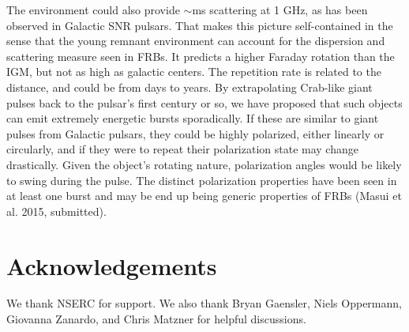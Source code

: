 \documentclass[useAMS,usenatbib]{mn2e}
\begin{document}
The environment could also provide $\sim$ms scattering at 1 GHz, as has been 
observed in Galactic SNR pulsars. 
That makes this picture self-contained in the sense that
the young remnant environment can account for the dispersion 
and scattering measure seen in FRBs.  It predicts a higher Faraday
rotation than the IGM, but not as high as galactic centers. The
repetition rate is related to the distance, and could be from days to
years. 
By extrapolating Crab-like giant pulses back to the pulsar's first century or so,
we have proposed that such objects can emit extremely energetic bursts sporadically. 
If these are similar to giant pulses from Galactic pulsars, they could be highly polarized, 
either linearly or circularly, and if they were to repeat their polarization state may 
change drastically. Given the object's rotating nature, polarization
 angles would be likely to swing during the pulse. The distinct polarization properties
have been seen in at least one burst and may be end up being generic properties 
of FRBs (Masui et al. 2015, submitted). 
\\



\section{Acknowledgements}

We thank NSERC for support. We also thank Bryan Gaensler, Niels Oppermann, 
Giovanna Zanardo, and Chris Matzner for helpful discussions. 

\newcommand{\araa}{ARA\&A}   %
\newcommand{\afz}{Afz}       %
\newcommand{\aj}{AJ}         %
\newcommand{\azh}{AZh}       %
\newcommand{\aaa}{A\&A}      %
\newcommand{\aas}{A\&AS}     %
\newcommand{\aar}{A\&AR}     %
\newcommand{\apj}{ApJ}       %
\newcommand{\apjs}{ApJS}     %
\newcommand{\apjl}{ApJ}      %
\newcommand{\apss}{Ap\&SS}   %
\newcommand{\baas}{BAAS}     %
\newcommand{\jaa}{JA\&A}     %
\newcommand{\mnras}{MNRAS}   %
\newcommand{\nat}{Nat}       %
\newcommand{\pasj}{PASJ}     %
\newcommand{\pasp}{PASP}     %
\newcommand{\paspc}{PASPC}   %
\newcommand{\qjras}{QJRAS}   %
\newcommand{\sci}{Sci}       %
\newcommand{\solphys}{Solar Physics}       %
\newcommand{\sova}{SvA}      %
\newcommand{\aap}{A\&A}
\newcommand\jcap{{J. Cosmology Astropart. Phys.}}%
\newcommand{\prd}{Phys. Rev. D}

%




\label{lastpage}
\end{document}
